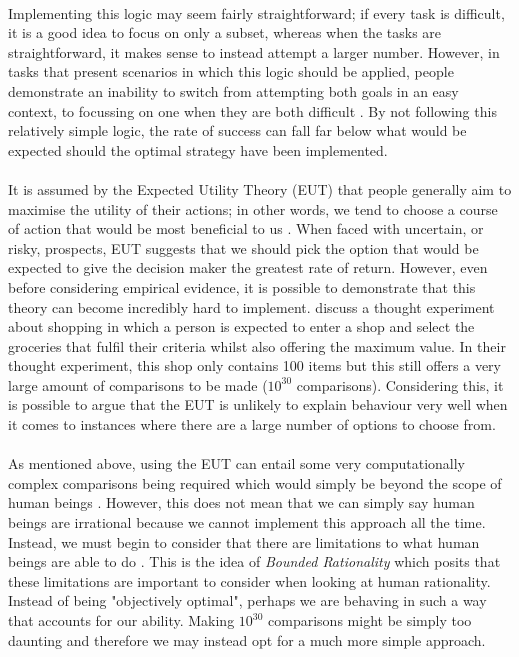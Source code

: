 \documentclass[12pt]{article}
\begin{document}
\paragraph{} Implementing this logic may seem fairly straightforward; if every task is difficult, it is a good idea to focus on only a subset, whereas when the tasks are straightforward, it makes sense to instead attempt a larger number. However, in tasks that present scenarios in which this logic should be applied,  people demonstrate an inability to switch from attempting both goals in an easy context, to focussing on one when they are both difficult \citep{clarke2015failure,morvan2012human}. By not following this relatively simple logic, the rate of success can fall far below what would be expected should the optimal strategy have been implemented. 

\paragraph{} It is assumed by the Expected Utility Theory (EUT) that people generally aim to maximise the utility of their actions; in other words, we tend to choose a course of action that would be most beneficial to us \citep{mongin1997expected}. When faced with uncertain, or risky, prospects, EUT suggests that we should pick the option that would be expected to give the decision maker the greatest rate of return. However, even before considering empirical evidence, it is possible to demonstrate that this theory can become incredibly hard to implement. \cite{BOSSAERTS2017917} discuss a thought experiment about shopping in which a person is expected to enter a shop and select the groceries that fulfil their criteria whilst also offering the maximum value. In their thought experiment, this shop only contains 100 items but this still offers a very large amount of comparisons to be made ($10^{30}$ comparisons). Considering this, it is possible to argue that the EUT is unlikely to explain behaviour very well when it comes to instances where there are a large number of options to choose from. 

\paragraph{} As mentioned above, using the EUT can entail some very computationally complex comparisons being required which would simply be beyond the scope of human beings \citep{BOSSAERTS2017917}. However, this does not mean that we can simply say human beings are irrational because we cannot implement this approach all the time. Instead, we must begin to consider that there are limitations to what human beings are able to do \citep{simon1990invariants}. This is the idea of \textit{Bounded Rationality} which posits that these limitations are important to consider when looking at human rationality. Instead of being "objectively optimal", perhaps we are behaving in such a way that accounts for our ability. Making $10^{30}$ comparisons might be simply too daunting and therefore we may instead opt for a much more simple approach. 
\end{document}
